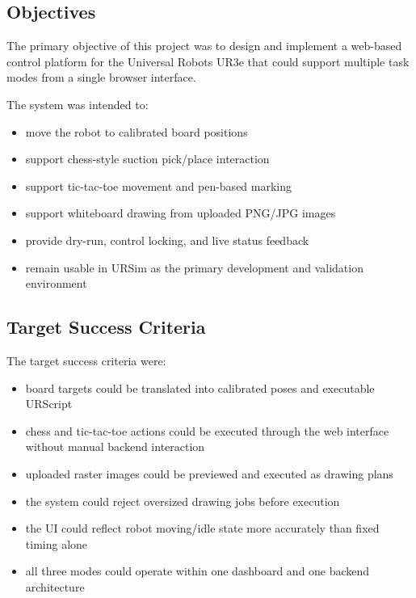 \documentclass[12pt]{article}
\begin{document}
\subsection{Objectives}
The primary objective of this project was to design and implement a web-based control platform for the Universal Robots UR3e that could support multiple task modes from a single browser interface.

The system was intended to:
\begin{itemize}[leftmargin=*]
\item move the robot to calibrated board positions
\item support chess-style suction pick/place interaction
\item support tic-tac-toe movement and pen-based marking
\item support whiteboard drawing from uploaded PNG/JPG images
\item provide dry-run, control locking, and live status feedback
\item remain usable in URSim as the primary development and validation environment
\end{itemize}

\subsection{Target Success Criteria}
The target success criteria were:
\begin{itemize}[leftmargin=*]
\item board targets could be translated into calibrated poses and executable URScript
\item chess and tic-tac-toe actions could be executed through the web interface without manual backend interaction
\item uploaded raster images could be previewed and executed as drawing plans
\item the system could reject oversized drawing jobs before execution
\item the UI could reflect robot moving/idle state more accurately than fixed timing alone
\item all three modes could operate within one dashboard and one backend architecture
\end{itemize}
\end{document}
